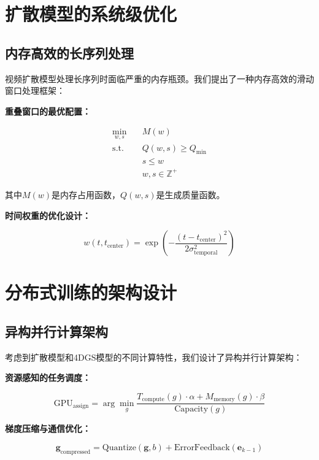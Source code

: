 \section{扩散模型的系统级优化}

\subsection{内存高效的长序列处理}

视频扩散模型处理长序列时面临严重的内存瓶颈。我们提出了一种内存高效的滑动窗口处理框架：

\textbf{重叠窗口的最优配置：}

\begin{align}
\min_{w,s} \quad & M(w) \\
\text{s.t.} \quad & Q(w, s) \geq Q_{\min} \\
& s \leq w \\
& w, s \in \mathbb{Z}^+
\label{eq:window_optimization}
\end{align}

其中$M(w)$是内存占用函数，$Q(w, s)$是生成质量函数。

\textbf{时间权重的优化设计：}

\begin{equation}
w(t, t_{\text{center}}) = \exp\left(-\frac{(t - t_{\text{center}})^2}{2\sigma_{\text{temporal}}^2}\right)
\label{eq:temporal_weighting}
\end{equation}

\section{分布式训练的架构设计}

\subsection{异构并行计算架构}

考虑到扩散模型和4DGS模型的不同计算特性，我们设计了异构并行计算架构：

\textbf{资源感知的任务调度：}

\begin{equation}
\text{GPU}_{\text{assign}} = \arg\min_g \frac{T_{\text{compute}}(g) \cdot \alpha + M_{\text{memory}}(g) \cdot \beta}{\text{Capacity}(g)}
\label{eq:resource_aware_scheduling}
\end{equation}

\textbf{梯度压缩与通信优化：}

\begin{equation}
\mathbf{g}_{\text{compressed}} = \text{Quantize}(\mathbf{g}, b) + \text{ErrorFeedback}(\mathbf{e}_{k-1})
\label{eq:gradient_compression}
\end{equation}

